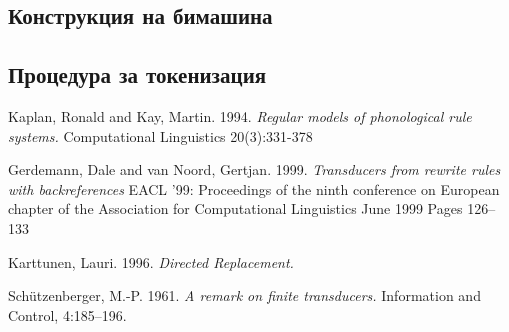 \documentclass[12pt, oneside]{article}
\theoremstyle{definition}
\begin{document}
\subsection{Конструкция на бимашина}
\subsection{Процедура за токенизация}

\pagebreak

\begin{thebibliography}{9}
	Kaplan, Ronald and Kay, Martin. 1994.
	\textit{Regular models of phonological rule systems.}
	Computational Linguistics 20(3):331-378

	Gerdemann, Dale and van Noord, Gertjan. 1999.
	\textit{Transducers from rewrite rules with backreferences}
	EACL '99: Proceedings of the ninth conference on European chapter of the Association for Computational Linguistics June 1999 Pages 126–133

	Karttunen, Lauri. 1996.
	\textit{Directed Replacement.}

	Schützenberger, M.-P. 1961. 
	\textit{A remark on finite transducers.} 
	Information and Control, 4:185–196.
	
\end{thebibliography}	
\end{document}
